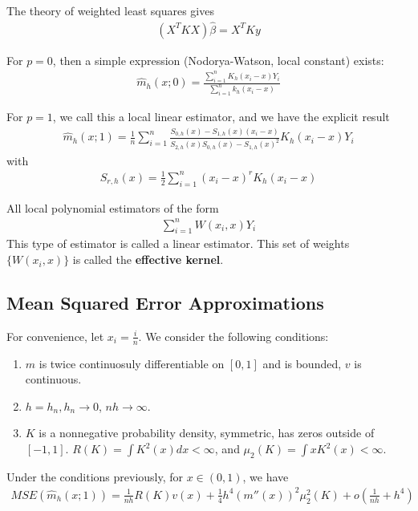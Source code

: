 The theory of weighted least squares gives
\begin{align}
  \label{eq:53}
  (X^{T} K X) \hat \beta = X^{T} K y
\end{align}

For $p = 0$, then a simple expression (Nodorya-Watson, local constant)
exists:
\begin{align}
  \label{eq:54}
  \hat m_{h}(x; 0) = \frac{\sum_{i=1}^{n} K_{h}(x_{i} -
    x)Y_{i}}{\sum_{i=1}^{n} k_{h}(x_{i} - x)}
\end{align}


For $p= 1$, we call this a local linear estimator, and we have the
explicit result
\begin{align}
  \label{eq:55}
  \hat m_{h}(x; 1) = \frac{1}{n} \sum_{i=1}^{n} \frac{S_{0, h}(x) -
    S_{1, h}(x)(x_{i} - x)}{S_{2, h}(x) S_{0, h}(x) - S_{1, h}(x)^{2}}
  K_{h}(x_{i} - x) Y_{i}
\end{align}
with
\begin{align}
  \label{eq:56}
  S_{r, h}(x) = \frac{1}{2} \sum_{i=1}^{n} (x_{i} - x)^{r} K_{h}(x_{i}
  - x)
\end{align}

All local polynomial estimators of the form
\begin{align}
  \label{eq:57}
  \sum_{i=1}^{n} W(x_{i}, x) Y_{i}
\end{align}
This type of estimator is called a linear estimator.   This set of
weights $\{ W(x_{i}, x) \}$ is called the \textbf{effective kernel}.

\subsection{Mean Squared Error Approximations}

For convenience, let $x_{i} = \frac{i}{n}$.  We consider the following
conditions:

\begin{enumerate}
\item $m$ is twice continuosuly differentiable on $[0, 1]$ and is bounded, $v$ is continuous.
\item $h = h_{n}, h_{n} \rightarrow 0$, $nh \rightarrow \infty$.
\item $K$ is a nonnegative probability density, symmetric, has zeros
  outside of $[-1, 1]$. $R(K) = \int K^{2}(x) dx < \infty$, and
  $\mu_{2}(K) = \int x K^{2}(x) < \infty$.
\end{enumerate}

\begin{thm}
  \label{defn:nonparametric_regression:1}
  Under the conditions previously, for $x \in (0, 1)$, we have
  \begin{align}
    \label{eq:58}
    MSE(\hat m_{h}(x; 1)) = \frac{1}{nh} R(K) v(x) + \frac{1}{4} h^{4}
    (m''(x))^{2} \mu_{2}^{2}(K) + o(\frac{1}{nh} + h^{4})
  \end{align}
\end{thm}

